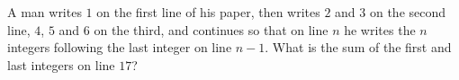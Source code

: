 A man writes $1$ on the first line of his paper, then writes $2$ and $3$ on the second line, $4$, $5$ and $6$ on the third, and continues so that on line $n$ he writes the $n$ integers following the last integer on line $n-1$. What is the sum of the first and last integers on line $17$?
